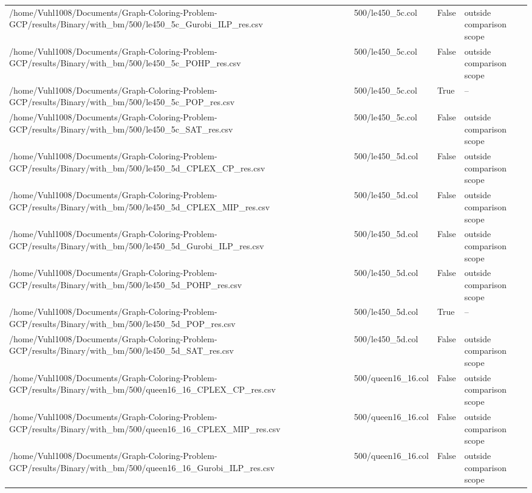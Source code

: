 \begin{table}[htbp]
\begin{tabular}{llll}
/home/Vuhl1008/Documents/Graph-Coloring-Problem-GCP/results/Binary/with\_bm/500/le450\_5c\_Gurobi\_ILP\_res.csv & 500/le450\_5c.col & False & outside comparison scope \\
/home/Vuhl1008/Documents/Graph-Coloring-Problem-GCP/results/Binary/with\_bm/500/le450\_5c\_POHP\_res.csv & 500/le450\_5c.col & False & outside comparison scope \\
/home/Vuhl1008/Documents/Graph-Coloring-Problem-GCP/results/Binary/with\_bm/500/le450\_5c\_POP\_res.csv & 500/le450\_5c.col & True & -- \\
/home/Vuhl1008/Documents/Graph-Coloring-Problem-GCP/results/Binary/with\_bm/500/le450\_5c\_SAT\_res.csv & 500/le450\_5c.col & False & outside comparison scope \\
/home/Vuhl1008/Documents/Graph-Coloring-Problem-GCP/results/Binary/with\_bm/500/le450\_5d\_CPLEX\_CP\_res.csv & 500/le450\_5d.col & False & outside comparison scope \\
/home/Vuhl1008/Documents/Graph-Coloring-Problem-GCP/results/Binary/with\_bm/500/le450\_5d\_CPLEX\_MIP\_res.csv & 500/le450\_5d.col & False & outside comparison scope \\
/home/Vuhl1008/Documents/Graph-Coloring-Problem-GCP/results/Binary/with\_bm/500/le450\_5d\_Gurobi\_ILP\_res.csv & 500/le450\_5d.col & False & outside comparison scope \\
/home/Vuhl1008/Documents/Graph-Coloring-Problem-GCP/results/Binary/with\_bm/500/le450\_5d\_POHP\_res.csv & 500/le450\_5d.col & False & outside comparison scope \\
/home/Vuhl1008/Documents/Graph-Coloring-Problem-GCP/results/Binary/with\_bm/500/le450\_5d\_POP\_res.csv & 500/le450\_5d.col & True & -- \\
/home/Vuhl1008/Documents/Graph-Coloring-Problem-GCP/results/Binary/with\_bm/500/le450\_5d\_SAT\_res.csv & 500/le450\_5d.col & False & outside comparison scope \\
/home/Vuhl1008/Documents/Graph-Coloring-Problem-GCP/results/Binary/with\_bm/500/queen16\_16\_CPLEX\_CP\_res.csv & 500/queen16\_16.col & False & outside comparison scope \\
/home/Vuhl1008/Documents/Graph-Coloring-Problem-GCP/results/Binary/with\_bm/500/queen16\_16\_CPLEX\_MIP\_res.csv & 500/queen16\_16.col & False & outside comparison scope \\
/home/Vuhl1008/Documents/Graph-Coloring-Problem-GCP/results/Binary/with\_bm/500/queen16\_16\_Gurobi\_ILP\_res.csv & 500/queen16\_16.col & False & outside comparison scope \\

\end{tabular}
\end{table}
